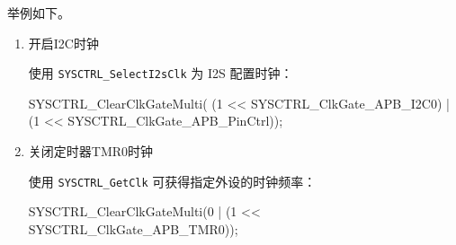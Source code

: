 \documentclass[
  12pt,
]{book}
\newenvironment{Shaded}{\begin{snugshade}}{\end{snugshade}}
\newcommand{\DecValTok}[1]{\textcolor[rgb]{0.00,0.00,0.81}{#1}}
\newcommand{\NormalTok}[1]{#1}
\begin{document}
举例如下。

\begin{enumerate}
\def\labelenumi{\arabic{enumi}.}
\item
  开启I2C时钟

  使用 \texttt{SYSCTRL\_SelectI2sClk} 为 I2S 配置时钟：

\begin{Shaded}
\begin{Highlighting}[]
\NormalTok{SYSCTRL_ClearClkGateMulti( (}\DecValTok{1}\NormalTok{ << SYSCTRL_ClkGate_APB_I2C0)}
\NormalTok{                          |(}\DecValTok{1}\NormalTok{ << SYSCTRL_ClkGate_APB_PinCtrl));}
\end{Highlighting}
\end{Shaded}
\item
  关闭定时器TMR0时钟

  使用 \texttt{SYSCTRL\_GetClk} 可获得指定外设的时钟频率：

\begin{Shaded}
\begin{Highlighting}[]
\NormalTok{SYSCTRL_ClearClkGateMulti(}\DecValTok{0}
\NormalTok{                        | (}\DecValTok{1}\NormalTok{ << SYSCTRL_ClkGate_APB_TMR0));}
\end{Highlighting}
\end{Shaded}
\end{enumerate}

  

\backmatter
\printindex
\end{document}
